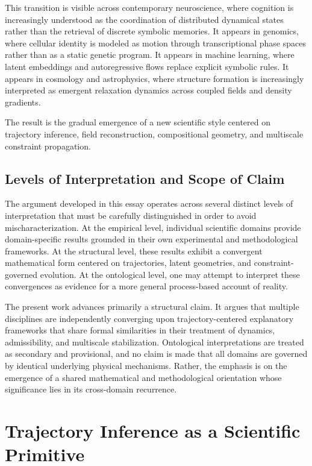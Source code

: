 \documentclass[12pt,a4paper]{article}
\begin{document}
This transition is visible across contemporary neuroscience, where cognition is
increasingly understood as the coordination of distributed dynamical states rather
than the retrieval of discrete symbolic memories. It appears in genomics, where
cellular identity is modeled as motion through transcriptional phase spaces rather
than as a static genetic program. It appears in machine learning, where latent
embeddings and autoregressive flows replace explicit symbolic rules. It appears in
cosmology and astrophysics, where structure formation is increasingly interpreted as
emergent relaxation dynamics across coupled fields and density gradients.

The result is the gradual emergence of a new scientific style centered on trajectory
inference, field reconstruction, compositional geometry, and multiscale constraint
propagation.

\subsection{Levels of Interpretation and Scope of Claim}

The argument developed in this essay operates across several distinct levels of
interpretation that must be carefully distinguished in order to avoid
mischaracterization. At the empirical level, individual scientific domains provide
domain-specific results grounded in their own experimental and methodological
frameworks. At the structural level, these results exhibit a convergent mathematical
form centered on trajectories, latent geometries, and constraint-governed evolution.
At the ontological level, one may attempt to interpret these convergences as evidence
for a more general process-based account of reality.

The present work advances primarily a structural claim. It argues that multiple
disciplines are independently converging upon trajectory-centered explanatory
frameworks that share formal similarities in their treatment of dynamics,
admissibility, and multiscale stabilization. Ontological interpretations are treated
as secondary and provisional, and no claim is made that all domains are governed by
identical underlying physical mechanisms. Rather, the emphasis is on the emergence
of a shared mathematical and methodological orientation whose significance lies in
its cross-domain recurrence.

\section{Trajectory Inference as a Scientific Primitive}
\end{document}
